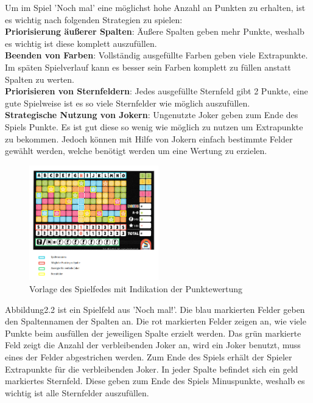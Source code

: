 Um im Spiel 'Noch mal' eine möglichst hohe Anzahl an Punkten zu erhalten, ist es wichtig nach folgenden Strategien zu spielen: \\
\textbf{Priorisierung äußerer Spalten}: Äußere Spalten geben mehr Punkte, weshalb es wichtig ist diese komplett auszufüllen. \\
\textbf{Beenden von Farben}: Vollständig ausgefüllte Farben geben viele Extrapunkte. Im späten Spielverlauf kann es besser sein Farben komplett zu füllen anstatt Spalten zu werten. \\
 \textbf{Priorisieren von Sternfeldern}: Jedes ausgefüllte Sternfeld gibt 2 Punkte, eine gute Spielweise ist es so viele Sternfelder wie möglich auszufüllen. \\
\textbf{Strategische Nutzung von Jokern}: Ungenutzte Joker geben zum Ende des Spiels Punkte. Es ist gut diese so wenig wie möglich zu nutzen um Extrapunkte zu bekommen. Jedoch können mit Hilfe von Jokern einfach bestimmte Felder gewählt werden, welche benötigt werden um eine Wertung zu erzielen.


\begin{figure}[!h]
	\centering
	\includegraphics[width=0.5\textwidth]{Bilder/Abbildung2.png}
	\caption{Vorlage des Spielfedes mit Indikation der Punktewertung}
\end{figure}

Abbildung2.2 ist ein Spielfeld aus 'Noch mal!'. Die blau markierten Felder geben den Spaltennamen der Spalten an. Die rot markierten Felder zeigen an, wie viele Punkte beim ausfüllen der jeweiligen Spalte erzielt werden. Das grün markierte Feld zeigt die Anzahl der verbleibenden Joker an, wird ein Joker benutzt, muss eines der Felder abgestrichen werden. Zum Ende des Spiels erhält der Spieler Extrapunkte für die verbleibenden Joker. In jeder Spalte befindet sich ein geld markiertes Sternfeld. Diese geben zum Ende des Spiels Minuspunkte, weshalb es wichtig ist alle Sternfelder auszufüllen.


